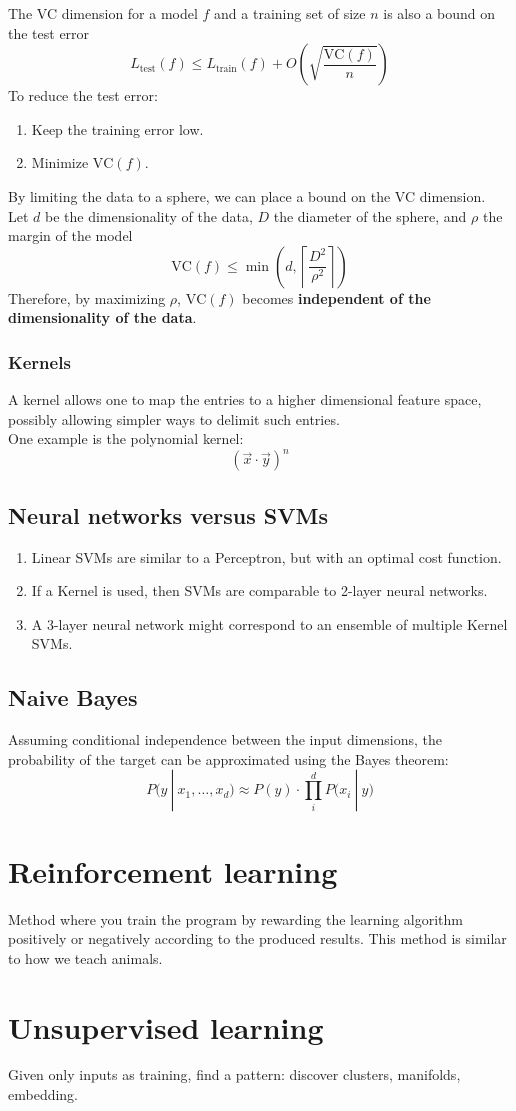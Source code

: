 \documentclass[11pt]{article}
\begin{document}
The VC dimension for a model \(f\) and a training set of size \(n\) is also a bound on the
test error
\[
  L_{\text{test}}(f) \leq L_{\text{train}}(f) + O\left(\sqrt{\frac{\text{VC}(f)}{n}}\right)
\]
To reduce the test error:
\begin{enumerate}
\item Keep the training error low.
\item Minimize \(\text{VC}(f)\).
\end{enumerate}
By limiting the data to a sphere, we can place a bound on the VC dimension. \\
Let \(d\) be the dimensionality of the data, \(D\) the diameter of the sphere, and
\(\rho\) the margin of the model
\[
  \text{VC}(f) \leq \min\left( d, \left\lceil \frac{D^2}{\rho^2} \right\rceil \right)
\]
Therefore, by maximizing \(\rho\), \(\text{VC}(f)\) becomes \textbf{independent of the dimensionality of
the data}.
\subsubsection{Kernels}
\label{sec:orge60fc03}
A kernel allows one to map the entries to a higher dimensional feature space, possibly
allowing simpler ways to delimit such entries. \\
One example is the polynomial kernel:
\[
  \left(\vec{x} \cdot \vec{y}\right)^n
\]
\subsection{Neural networks versus SVMs}
\label{sec:org3c6a263}
\begin{enumerate}
\item Linear SVMs are similar to a Perceptron, but with an optimal cost function.
\item If a Kernel is used, then SVMs are comparable to 2-layer neural networks.
\item A 3-layer neural network might correspond to an ensemble of multiple Kernel SVMs.
\end{enumerate}
\subsection{Naive Bayes}
\label{sec:orgf6ebee1}
Assuming conditional independence between the input dimensions, the probability of the
target can be approximated using the Bayes theorem:
\[
  P\big(y \>|\> x_1, \hdots, x_d \big) \approx P(y) \cdot \prod_{i}^{d} P\big( x_i \>|\> y \big)
\]
\section{Reinforcement learning}
\label{sec:org32d2780}
Method where you train the program by rewarding the learning algorithm positively or
negatively according to the produced results. This method is similar to how we teach
animals.
\section{Unsupervised learning}
\label{sec:orgc6eff52}
Given only inputs as training, find a pattern: discover clusters, manifolds, embedding.
\end{document}
